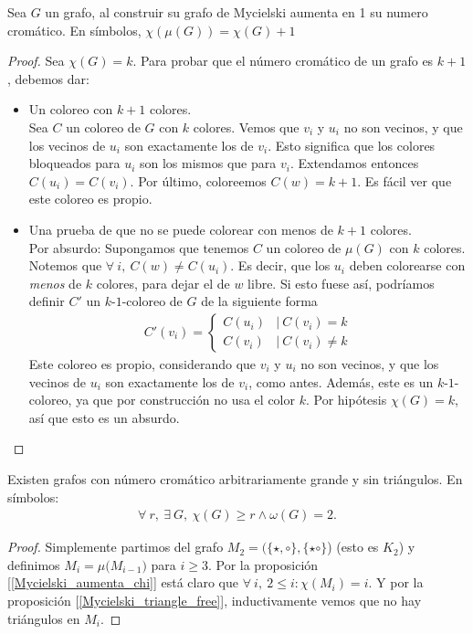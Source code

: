 \begin{proposition}\label{Mycielski_aumenta_chi}
Sea $G$ un grafo, al construir su grafo de Mycielski aumenta en 1 su numero cromático. En símbolos,
$\chi({\mu(G)}) = \chi(G) + 1$
\end{proposition}

\begin{proof}
Sea $\chi(G) = k$. Para probar que el número cromático de un grafo es $k+1$, debemos dar:
\begin{itemize}
    \item Un coloreo con $k+1$ colores.\\
    Sea $C$ un coloreo de $G$ con $k$ colores. Vemos que $v_i$ y $u_i$ no son vecinos, y que los vecinos de $u_i$ son exactamente los de $v_i$. Esto significa que los colores bloqueados para $u_i$ son los mismos que para $v_i$. Extendamos entonces $C(u_i) = C(v_i)$. Por último, coloreemos $C(w) = k+1$. Es fácil ver que este coloreo es propio.
    
    \item Una prueba de que no se puede colorear con menos de $k+1$ colores.\\
    Por absurdo: Supongamos que tenemos $C$ un coloreo de $\mu(G)$ con $k$ colores. Notemos que $\forall~ i,~ C(w) \neq C(u_i)$. Es decir, que los $u_i$ deben colorearse con \emph{menos} de $k$ colores, para dejar el de $w$ libre. Si esto fuese así, podríamos definir $C'$ un $k$-$1$-coloreo de $G$ de la siguiente forma
    \begin{align}
           C'(v_i) =
        \begin{cases}
            C(u_i) & |\ C(v_i) = k\\
            C(v_i) & |\ C(v_i) \neq k
        \end{cases}
    \end{align}
    Este coloreo es propio, considerando que $v_i$ y $u_i$ no son vecinos, y que los vecinos de $u_i$ son exactamente los de $v_i$, como antes.
    Además, este es un $k$-$1$-coloreo, ya que por construcción no usa el color $k$. Por hipótesis $\chi(G) = k$, así que esto es un absurdo.
\end{itemize}
\end{proof}

\begin{proposition}
Existen grafos con número cromático arbitrariamente grande y sin triángulos. En símbolos:
\begin{align}
    \forall~ r,~ \exists~ G,~ \chi(G) \ge r \wedge \omega(G) = 2.
\end{align}
\end{proposition}

\begin{proof}
Simplemente partimos del grafo $M_2 = (\{\star, \circ\}, \{\star\circ\}$) (esto es $K_2$) y definimos $M_i = \mu({M_{i-1})}$ para $i \ge 3$. Por la proposición [\ref{Mycielski_aumenta_chi}] está claro que $\forall~ i,~ 2 \le i : \chi(M_i) = i$. Y por la proposición [\ref{Mycielski_triangle_free}], inductivamente vemos que no hay triángulos en $M_i$.
\end{proof}